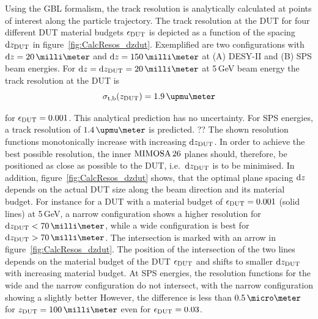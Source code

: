 
Using the GBL formalism, the track resolution is analytically calculated at points of interest along the particle trajectory. 
The track resolution at the DUT for four different DUT material budgets $\mathnormal{\epsilon_{\textrm{DUT}}}$ is depicted as a function of the spacing $\textrm{d}z_{\textrm{DUT}}$ in figure~\ref{fig:CalcResos_dzdut}.
Exemplified are two configurations with $\dz = 20\,\milli\meter$ and $\dz = 150\,\milli\meter$ at (A) DESY-II and (B) SPS beam energies. 
For $\dz = \dzdut = 20\,\milli\meter$ at 5\,GeV beam energy the track resolution at the DUT is 
\begin{equation}
 \sigmatb(\zdut) = 1.9\,\upmu\meter
\end{equation}

\noindent
for $\mathnormal{\epsilon_{\textrm{DUT}}} = 0.001$.
This analytical prediction has no uncertainty. 
For SPS energies, a track resolution of $1.4\,\upmu\meter$ is predicted. ??
The shown resolution functions monotonically increase with increasing $\textrm{d}z_{\textrm{DUT}}$. 
In order to achieve the best possible resolution, the inner $\textrm{MIMOSA\,26}$ planes should, therefore, be positioned as close as possible to the DUT, i.e.~$\textrm{d}z_{\textrm{DUT}}$ is to be minimised. 
In addition, figure~\ref{fig:CalcResos_dzdut} shows, that the optimal plane spacing $\textrm{d}z$ depends on the actual DUT size along the beam direction and its material budget.
For instance for a DUT with a material budget of $\mathnormal{\epsilon_{\textrm{DUT}}} = 0.001$ (solid lines) at 5\,GeV, a narrow configuration shows a higher resolution for $\dzdut < 70\,\milli\meter$,
 while a wide configuration is best for $\dzdut > 70\,\milli\meter$.
The intersection is marked with an arrow in figure~\ref{fig:CalcResos_dzdut}. 
The position of the intersection of the two lines depends on the material budget of the DUT $\mathnormal{\epsilon_{\textrm{DUT}}}$ and shifts to smaller $\textrm{d}z_{\textrm{DUT}}$ with increasing material budget. 
At SPS energies, the resolution functions for the wide and the narrow configuration do not intersect, with the narrow configuration showing a slightly better
However, the difference is less than $0.5\,\micro\meter$ for $\zdut = 100\,\milli\meter$ even for $\mathnormal{\epsilon_{\textrm{DUT}}} = 0.03$. 

